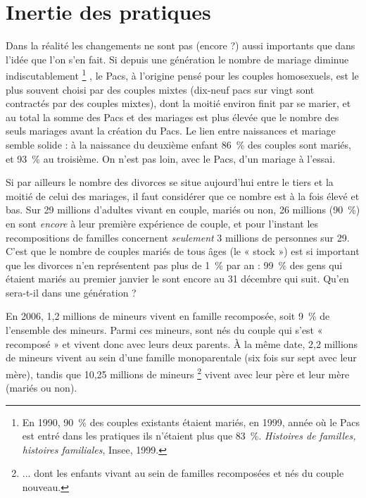 
\chapter{Inertie des pratiques}


 Dans la réalité les changements ne sont pas (encore ?) aussi importants que dans l'idée que l'on s'en fait. Si depuis une génération le nombre de mariage diminue indiscutablement%
\footnote{En 1990, 90~\% des couples existants étaient mariés, en 1999, année où le Pacs est entré dans les pratiques ils n'étaient plus que 83~\%. \emph{Histoires de familles, histoires familiales}, Insee, 1999.}%
, le Pacs, à l'origine pensé pour les couples homosexuels, est le plus souvent choisi par des couples mixtes (dix-neuf pacs sur vingt sont contractés par des couples mixtes), dont la moitié environ finit par se marier, et au total la somme des Pacs et des mariages est plus élevée que le nombre des seuls mariages avant la création du Pacs. Le lien entre naissances et mariage semble solide : à la naissance du deuxième enfant 86~\% des couples sont mariés, et 93~\% au troisième. On n'est pas loin, avec le Pacs, d'un mariage à l'essai.

 Si par ailleurs le nombre des divorces se situe aujourd'hui entre le tiers et la moitié de celui des mariages, il faut considérer que ce nombre est à la fois élevé et bas. Sur 29 millions d'adultes vivant en couple, mariés ou non, 26 millions (90~\%) en sont \emph{encore} à leur première expérience de couple, et pour l'instant les recompositions de familles concernent \emph{seulement} 3 millions de personnes sur 29. C'est que le nombre de couples mariés de tous âges (le « stock ») est si important que les divorces n'en représentent pas plus de 1~\% par an : 99~\% des gens qui étaient mariés au premier janvier le sont encore au 31 décembre qui suit. Qu'en sera-t-il dans une génération ?

 En 2006, 1,2 millions de mineurs vivent en famille recomposée, soit 9~\% de l'ensemble des mineurs. Parmi ces mineurs,  sont nés du couple qui s'est « recomposé » et vivent donc avec leurs deux parents. À la même date, 2,2 millions de mineurs vivent au sein d'une famille monoparentale (six fois sur sept avec leur mère), tandis que 10,25 millions de mineurs%
\footnote{... dont les  enfants vivant au sein de familles recomposées et nés du couple nouveau.} 
vivent avec leur père et leur mère (mariés ou non). 
 


\addtolength{\abovecaptionskip}{5pt}
\addtolength{\belowcaptionskip}{10pt}
\newlength{\lcol}
\setlength{\lcol}{0.16666667\textwidth}
\addtolength{\lcol}{-2\tabcolsep}


